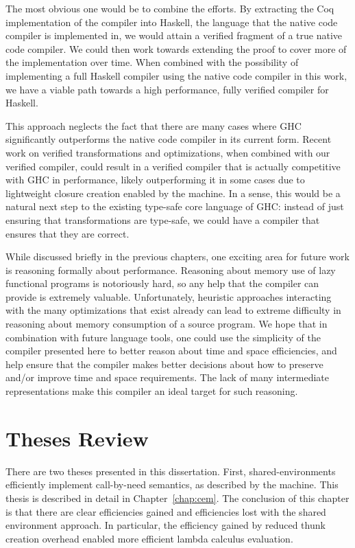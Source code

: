The most obvious one would be to combine the efforts. By extracting the Coq
implementation of the compiler into Haskell, the language that the native code
compiler is implemented in, we would attain a verified fragment of a true native
code compiler. We could then work towards extending the proof to cover more of
the implementation over time. When combined with the possibility of implementing
a full Haskell compiler using the native code compiler in this work, we have a
viable path towards a high performance, fully verified compiler for Haskell. 

This approach neglects the fact that there are many cases where GHC
significantly outperforms the native code compiler in its current form. Recent
work on verified transformations and optimizations, when combined with our
verified compiler, could result in a verified compiler that is actually
competitive with GHC in performance, likely outperforming it in some cases due
to lightweight closure creation enabled by the \ce machine. In a sense, this
would be a natural next step to the existing type-safe core language of GHC:
instead of just ensuring that transformations are type-safe, we could have a
compiler that ensures that they are correct.

While discussed briefly in the previous chapters, one exciting area for future
work is reasoning formally about performance. Reasoning about memory use of lazy
functional programs is notoriously hard, so any help that the compiler can
provide is extremely valuable. Unfortunately, heuristic approaches interacting
with the many optimizations that exist already can lead to extreme difficulty in
reasoning about memory consumption of a source program. We hope that in
combination with future language tools, one could use the simplicity of the
compiler presented here to better reason about time and space efficiencies, and
help ensure that the compiler makes better decisions about how to preserve
and/or improve time and space requirements. The lack of many intermediate
representations make this compiler an ideal target for such reasoning.

\section{Theses Review}

There are two theses presented in this dissertation. First, shared-environments
efficiently implement call-by-need semantics, as described by the \ce machine.
This thesis is described in detail in Chapter~\ref{chap:cem}. The conclusion of
this chapter is that there are clear efficiencies gained and efficiencies lost
with the shared environment approach. In particular, the efficiency gained by
reduced thunk creation overhead enabled more efficient lambda calculus
evaluation. 

